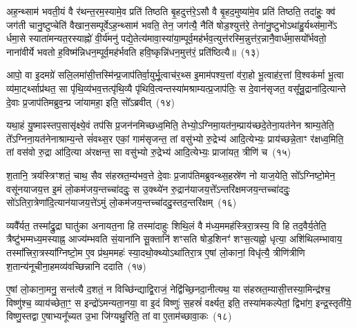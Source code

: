 अह॒न्थ्साम॑ भवती॒यं वै र॑थन्त॒रम॒स्यामे॒व प्रति॑ तिष्ठति बृ॒हदुत्त॑रे॒\-ऽसौ वै बृ॒हद॒मुष्या॑मे॒व प्रति॑ तिष्ठति॒ तदा॑हुः॒ क्व॑ जग॑ती चानु॒ष्टुप्चेति॑ वैखान॒सम्पूर्वे\-ऽह॒न्थ्साम॑ भवति॒ तेन॒ जग॑त्यै॒ नैति॑ षोड॒श्युत्त॑रे॒ तेना॑नु॒ष्टुभो\-ऽथा॑हु॒र्यथ्स॑मा॒ने᳚\-ऽ र्धमा॒से स्याता॑मन्यत॒रस्याह्नो॑ वी॒र्य॑मनु॑ पद्ये॒तेत्य॑मावा॒स्या॑या॒म्पूर्व॒मह॑र्भव॒त्युत्त॑रस्मि॒न्नुत्त॑र॒न्नानै॒वार्ध॑मा॒सयो᳚र्भवतो॒ नाना॑वीर्ये भवतो ह॒विष्म॑न्निधन॒म्पूर्व॒मह॑र्भवति हवि॒ष्कृन्नि॑धन॒मुत्त॑रं॒ प्रति॑ष्ठित्यै॥~(१३)

{}%

आपो॒ वा इ॒दमग्रे॑ सलि॒लमा॑सी॒त्तस्मि॑न्प्र॒जा\-प॑तिर्वा॒युर्भू॒त्वाच॑र॒थ्स इ॒माम॑पश्य॒त्तां व॑रा॒हो भू॒त्वाह॑र॒त्तां वि॒श्वक॑र्मा भू॒त्वा व्य॑मा॒र्ट्थ्साप्र॑थत॒ सा पृ॑थि॒व्य॑भव॒त्तत्पृ॑थि॒व्यै पृ॑थिवि॒त्वन्तस्या॑मश्राम्यत्प्र॒जा\-प॑तिः॒ स दे॒वान॑सृजत॒ वसू᳚न्रु॒द्राना॑दि॒त्यान्ते दे॒वाः प्र॒जा\-प॑तिमब्रुव॒न्प्र जा॑यामहा॒ इति॒ सो᳚\-ऽब्रवीत्~(१४)

यथा॒हं यु॒ष्माꣴस्तप॒सासृ॑क्ष्ये॒वं तप॑सि प्र॒जन॑नमिच्छध्व॒मिति॒ तेभ्यो॒\-ऽग्निमा॒यत॑न॒म्प्राय॑च्छदे॒तेना॒यत॑नेन श्राम्य॒तेति॒ ते᳚\-ऽग्निना॒यत॑नेनाश्राम्य॒न्ते सं॑वथ्स॒र एकां॒ गाम॑सृजन्त॒ तां वसु॑भ्यो रु॒द्रेभ्य॑ आदि॒त्येभ्यः॒ प्राय॑च्छन्ने॒ताꣳ र॑क्षध्व॒मिति॒ तां वस॑वो रु॒द्रा आ॑दि॒त्या अ॑रक्षन्त॒ सा वसु॑भ्यो रु॒द्रेभ्य॑ आदि॒त्येभ्यः॒ प्राजा॑यत॒ त्रीणि॑ च~(१५)

श॒तानि॒ त्रय॑स्त्रिꣳशतं॒ चाथ॒ सैव स॑हस्रत॒म्य॑भव॒त्ते दे॒वाः प्र॒जा\-प॑तिमब्रुवन्थ्स॒हस्रे॑ण नो याज॒येति॒ सो᳚\-ऽग्निष्टो॒मेन॒ वसू॑नयाजय॒त्त इ॒मं लो॒कम॑जय॒न्तच्चा॑ददुः॒ स उ॒क्थ्ये॑न रु॒द्रान॑याजय॒त्ते᳚\-ऽन्तरि॑क्षमजय॒न्तच्चा॑ददुः॒ सो॑\-ऽतिरा॒त्रेणा॑\-दि॒त्यान॑याजय॒त्ते॑\-ऽमुं लो॒कम॑जय॒न्तच्चा॑ददु॒स्तद॒न्तरि॑क्षम्~(१६)

व्यवै᳚र्यत॒ तस्मा᳚द्रु॒द्रा घातु॑का अनायत॒ना हि तस्मा॑दाहुः शिथि॒लं वै म॑ध्य॒ममह॑स्त्रिरा॒त्रस्य॒ वि हि तद॒वैर्य॒तेति॒ त्रैष्टु॑भम्मध्य॒मस्याह्न॒ आज्य॑म्भवति सं॒याना॑नि सू॒क्तानि॑ शꣳसति षोड॒शिनꣳ॑ शꣳस॒त्यह्नो॒ धृत्या॒ अशि॑थिलम्भावाय॒ तस्मा᳚त्त्रिरा॒त्रस्या᳚ग्निष्टो॒म ए॒व प्र॑थ॒ममहः॑ स्या॒दथो॒क्थ्यो\-ऽथा॑तिरा॒त्र ए॒षां लो॒कानां॒ विधृ॑त्यै॒ त्रीणि॑त्रीणि श॒तान्य॑नूचीना॒हमव्य॑वच्छिन्नानि ददाति~(१७)

ए॒षां लो॒काना॒मनु॒ सन्त॑त्यै द॒शतं॒ न विच्छि॑न्द्याद्वि॒राजं॒ नेद्वि॑च्छि॒नदा॒नीत्यथ॒ या स॑हस्रत॒म्यासी॒त्तस्या॒मिन्द्र॑श्च॒ विष्णु॑श्च॒ व्याय॑च्छेता॒ꣳ॒ स इन्द्रो॑\-ऽमन्यता॒नया॒ वा इ॒दं विष्णुः॑ स॒हस्रं॑ वर्क्ष्यत॒ इति॒ तस्या॑मकल्पेतां॒ द्विभा॑ग॒ इन्द्र॒स्तृती॑ये॒ विष्णु॒स्तद्वा ए॒षाभ्यनू᳚च्यत उ॒भा जि॑ग्यथु॒रिति॒ तां वा ए॒ताम॑च्छावा॒कः~(१८)

